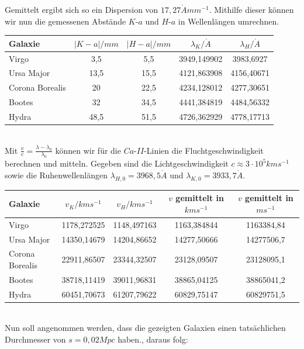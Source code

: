 \documentclass[12pt]{article}
\begin{document}
Gemittelt ergibt sich so ein Dispersion von $17,27 \mathring{A} mm^{-1}$. Mithilfe dieser können wir nun die gemessenen Abstände $K$-$a$ und $H$-$a$ in Wellenlängen umrechnen.
\begin{table}[!ht]
    \centering
    \begin{tabular}{l|c|c|c|c}
        Galaxie & $|K-a|/mm$ & $|H-a|/mm$ & $\lambda_K / \mathring{A}$ & $\lambda_H / \mathring{A}$ \\ \hline
        Virgo & 3,5 & 5,5 & 3949,149902 & 3983,6927 \\ 
        Ursa Major & 13,5 & 15,5 & 4121,863908 & 4156,40671 \\ 
        Corona Borealis & 20 & 22,5 & 4234,128012 & 4277,30651 \\ 
        Bootes & 32 & 34,5 & 4441,384819 & 4484,56332 \\ 
        Hydra & 48,5 & 51,5 & 4726,362929 & 4778,17713 \\ 
    \end{tabular}
\end{table}\\
Mit $\frac{v}{c} = \frac{\lambda - \lambda_0}{\lambda_0}$ können wir für die $Ca$-$II$-Linien die Fluchtgeschwindigkeit berechnen und mitteln. Gegeben sind die Lichtgeschwindigkeit $c \approx 3 \cdot 10^5 kms^{-1}$ sowie die Ruhenwellenlängen $\lambda_{H,0} = 3968,5 \mathring{A}$ und $\lambda_{K,0} = 3933,7 \mathring{A}$.
\newpage\noindent
\begin{table}[!ht]
    \centering
    \begin{tabular}{l|c|c|c|c}
        Galaxie & $v_K / kms^{-1}$ & $v_H / kms^{-1}$ & $v$ gemittelt in $kms^{-1}$ & $v$ gemittelt in $ms^{-1}$\\ \hline
        Virgo & 1178,272525 & 1148,497163 & 1163,384844 & 1163384,84 \\ 
        Ursa Major & 14350,14679 & 14204,86652 & 14277,50666 & 14277506,7 \\
        Corona Borealis & 22911,86507 & 23344,32507 & 23128,09507 & 23128095,1 \\ 
        Bootes & 38718,11419 & 39011,96831 & 38865,04125 & 38865041,2 \\
        Hydra & 60451,70673 & 61207,79622 & 60829,75147 & 60829751,5 \\
    \end{tabular}
\end{table}\\
Nun soll angenommen werden, dass die gezeigten Galaxien einen tatsächlichen Durchmesser von $s = 0,02 Mpc$ haben., daraus folg:
\end{document}
